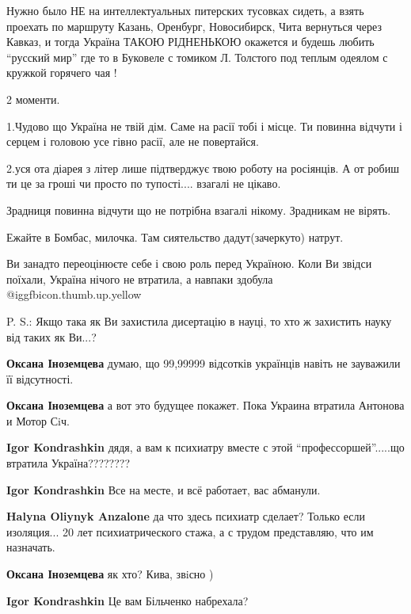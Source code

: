 \begin{itemize}

Нужно было НЕ на интеллектуальных питерских тусовках сидеть, а взять проехать
по маршруту Казань, Оренбург, Новосибирск, Чита вернуться через Кавказ, и
тогда Україна ТАКОЮ РІДНЕНЬКОЮ окажется и будешь любить \enquote{русский мир} где то в
Буковеле с томиком Л. Толстого под теплым одеялом с кружкой горячего чая !


2 моменти.

1.Чудово що Україна не твій дім. Саме на расії тобі і місце. Ти повинна відчути
і серцем і головою усе гівно расії, але не повертайся.

2.уся ота діарея з літер лише підтверджує твою роботу на росіянців. А от робиш
ти це за гроші чи просто по тупості.... взагалі не цікаво.

Зрадниця повинна відчути що не потрібна взагалі нікому. Зрадникам не вірять.

Ежайте в Бомбас, милочка. Там сиятельство дадут(зачеркуто) натрут.


Ви занадто переоцінюєте себе і свою роль перед Україною. Коли Ви звідси
поїхали, Україна нічого не втратила, а навпаки здобула
@igg{fbicon.thumb.up.yellow} 

P. S.: Якщо така як Ви захистила дисертацію в науці, то хто ж захистить науку
від таких як Ви...?

\begin{itemize} %
\textbf{Оксана Іноземцева} думаю, що 99,99999 відсотків українців навіть не зауважили її відсутності.

\textbf{Оксана Іноземцева} а вот это будущее покажет. Пока Украина втратила Антонова и Мотор Сiч.

\textbf{Igor Kondrashkin} дядя, а вам к психиатру вместе с этой \enquote{профессоршей}.....що втратила Україна????????

\textbf{Igor Kondrashkin} Все на месте, и всё работает, вас абманули.

\textbf{Halyna Oliynyk Anzalone} да что здесь психиатр сделает? Только если изоляция... 20 лет психиатрического стажа, а с трудом представляю, что им назначать.

\textbf{Оксана Іноземцева} як хто? Кива, звiсно )

\textbf{Igor Kondrashkin} Це вам Більченко набрехала?


\end{itemize}
\end{itemize}
